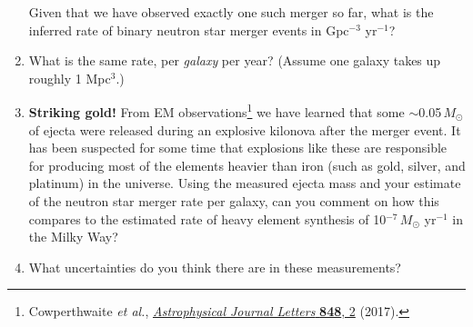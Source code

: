 \documentclass[11pt]{article}
\begin{document}
\begin{enumerate}
Given that we have observed exactly one such merger so far, what is the inferred rate of binary neutron star merger events in Gpc$^{-3}$ yr$^{-1}$?

\item What is the same rate, per \emph{galaxy} per year? (Assume one galaxy takes up roughly 1 Mpc$^3$.)

\item \textbf{Striking gold!} From EM observations\footnote{Cowperthwaite \textit{et al.}, \href{http://iopscience.iop.org/article/10.3847/2041-8213/aa8fc7}{\textit{
Astrophysical Journal Letters} \textbf{848}, 2} (2017).} we have learned that some $\sim$0.05\,$M_{\odot}$ of ejecta were released during an
explosive kilonova after the merger event. It has been suspected for some time that explosions like these are responsible for producing most of
the elements heavier than iron (such as gold, silver, and platinum) in the universe. Using the measured ejecta mass and your estimate of the
neutron star merger rate per galaxy, can you comment on how this compares to the estimated rate of heavy element synthesis of 10$^{-\text{7}}$\,$M_{\odot}$
yr$^{-1}$ in the Milky Way?

\item What uncertainties do you think there are in these measurements?

\end{enumerate}
\end{document}

